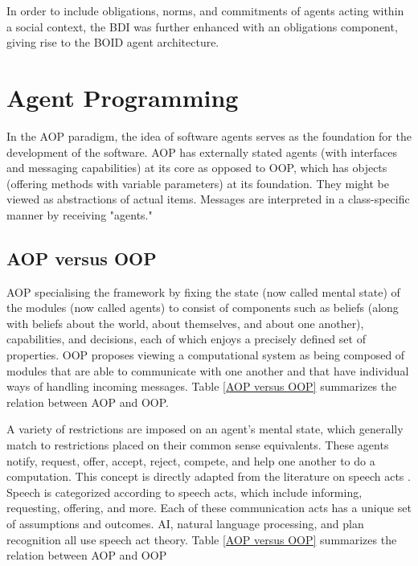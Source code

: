 In order to include obligations, norms, and commitments of agents acting within a social context, the \ac{BDI} was further enhanced with an obligations component, giving rise to the \ac{BOID} \cite{boid} agent architecture.


\section{Agent Programming}

In the \ac{AOP} paradigm, the idea of software agents serves as the foundation for the development of the software. \ac{AOP} has externally stated agents (with interfaces and messaging capabilities) at its core as opposed to \ac{OOP}, which has objects (offering methods with variable parameters) at its foundation. They might be viewed as abstractions of actual items. Messages are interpreted in a class-specific manner by receiving "agents."

\subsection{\ac{AOP} versus \ac{OOP}}

\ac{AOP} specialising the framework by fixing the state (now called mental state) of the modules (now called agents) to consist of components such as beliefs (along with beliefs about the world, about themselves, and about one another), capabilities, and decisions, each of which enjoys a precisely defined set of properties. OOP proposes viewing a computational system as being composed of modules that are able to communicate with one another and that have individual ways of handling incoming messages.  Table \ref{AOP versus OOP} summarizes the relation between \ac{AOP} and \ac{OOP}.

\vspace{.5cm}

A variety of restrictions are imposed on an agent's mental state, which generally match to restrictions placed on their common sense equivalents. These agents notify, request, offer, accept, reject, compete, and help one another to do a computation. This concept is directly adapted from the literature on speech acts \cite{speech}. Speech is categorized according to speech acts, which include informing, requesting, offering, and more. Each of these communication acts has a unique set of assumptions and outcomes. \ac{AI}, natural language processing, and plan recognition all use speech act theory.
 Table \ref{AOP versus OOP} summarizes the relation between AOP and OOP

